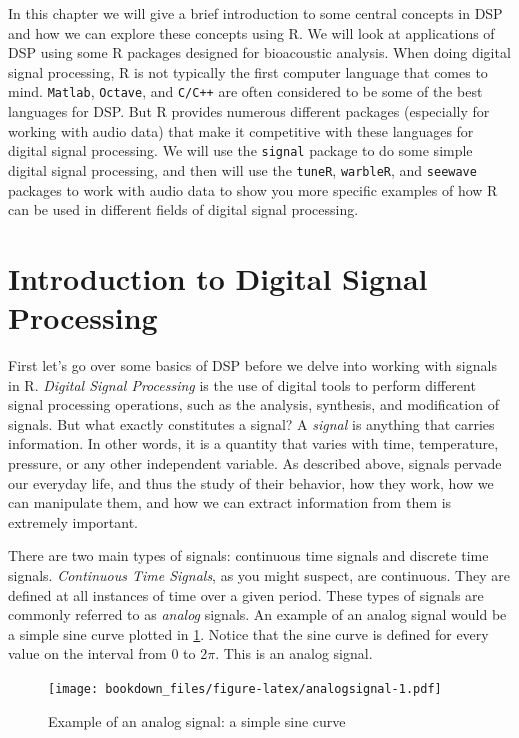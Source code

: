 \documentclass[
]{krantz}
\begin{document}
In this chapter we will give a brief introduction to some central concepts in DSP and how we can explore these concepts using R. We will look at applications of DSP using some R packages designed for bioacoustic analysis. When doing digital signal processing, R is not typically the first computer language that comes to mind. \texttt{Matlab}, \texttt{Octave}, and \texttt{C/C++} are often considered to be some of the best languages for DSP. But R provides numerous different packages (especially for working with audio data) that make it competitive with these languages for digital signal processing. We will use the \texttt{signal} package to do some simple digital signal processing, and then will use the \texttt{tuneR}, \texttt{warbleR}, and \texttt{seewave} packages to work with audio data to show you more specific examples of how R can be used in different fields of digital signal processing.

\hypertarget{introduction-to-digital-signal-processing}{%
\section{Introduction to Digital Signal Processing}\label{introduction-to-digital-signal-processing}}

First let's go over some basics of DSP before we delve into working with signals in R. \emph{Digital Signal Processing} is the use of digital tools to perform different signal processing operations, such as the analysis, synthesis, and modification of signals. But what exactly constitutes a signal? A \emph{signal} is anything that carries information. In other words, it is a quantity that varies with time, temperature, pressure, or any other independent variable. As described above, signals pervade our everyday life, and thus the study of their behavior, how they work, how we can manipulate them, and how we can extract information from them is extremely important.

There are two main types of signals: continuous time signals and discrete time signals. \emph{Continuous Time Signals}, as you might suspect, are continuous. They are defined at all instances of time over a given period. These types of signals are commonly referred to as \emph{analog} signals. An example of an analog signal would be a simple sine curve plotted in \ref{fig:analogsignal}. Notice that the sine curve is defined for every value on the interval from 0 to 2\(\pi\). This is an analog signal.

\begin{figure}
\centering
\texttt{[image: bookdown\_files/figure-latex/analogsignal-1.pdf]}
\caption{\label{fig:analogsignal}Example of an analog signal: a simple sine curve}
\end{figure}
\end{document}
